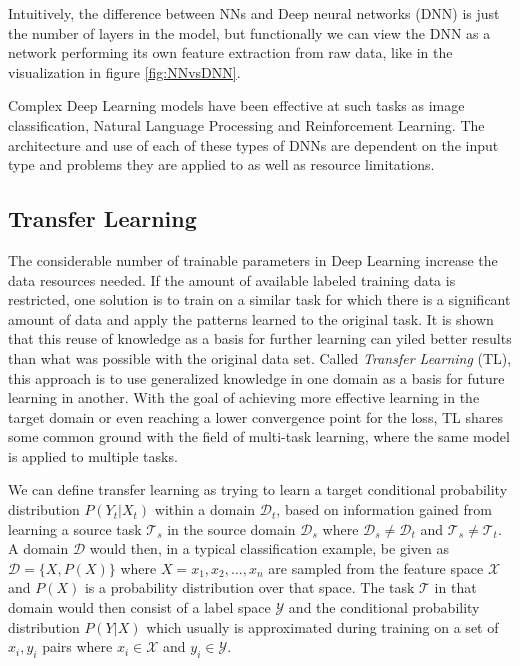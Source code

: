 Intuitively, the difference between NNs and Deep neural networks (DNN) is just the number of layers in the model, but functionally we can view the DNN as a network performing its own feature extraction from raw data, like in the visualization in figure \ref{fig:NNvsDNN}. 

Complex Deep Learning models have been effective at such tasks as image classification\cite{imageclassification}, Natural Language Processing\cite{deepnlp} and Reinforcement Learning\cite{deepreinforcementlearning}. The architecture and use of each of these types of DNNs are dependent on the input type and problems they are applied to as well as resource limitations.

\subsection{Transfer Learning}
\label{background:TL}
The considerable number of trainable parameters in Deep Learning increase the data resources needed. If the amount of available labeled training data is restricted, one solution is to train on a similar task for which there is a significant amount of data and apply the patterns learned to the original task. It is shown that this reuse of knowledge as a basis for further learning can yiled better results than what was possible with the original data set\cite{pathnet, progressiveneuralnetworks, tradaboost}. Called \textit{Transfer Learning} (TL), this approach is to use generalized knowledge in one domain as a basis for future learning in another. With the goal of achieving more effective learning in the target domain or even reaching a lower convergence point for the loss, TL shares some common ground with the field of multi-task learning, where the same model is applied to multiple tasks. 

We can define transfer learning as trying to learn a target conditional probability distribution \(P(Y_{t}|X_{t})\) within a domain \(\mathcal{D}_{t}\), based on information gained from learning a source task \(\mathcal{T}_{s}\) in the source domain \(\mathcal{D}_{s}\) where \(\mathcal{D}_{s} \neq \mathcal{D}_{t}\) and \(\mathcal{T}_{s} \neq \mathcal{T}_{t}\). A domain \(\mathcal{D}\) would then, in a typical classification example, be given as \(\mathcal{D} = \{X, P(X)\}\) where \(X = x_{1},x_{2}, \dotsc ,x_{n}\) are sampled from the feature space \(\mathcal{X}\) and \(P(X)\) is a probability distribution over that space. The task \(\mathcal{T}\) in that domain would then consist of a label space \(\mathcal{Y}\) and the conditional probability distribution \(P(Y|X)\) which usually is approximated during training on a set of \(x_{i}, y_{i}\) pairs where \(x_{i} \in \mathcal{X}\) and \(y_{i} \in \mathcal{Y}\).
\newline\newline


